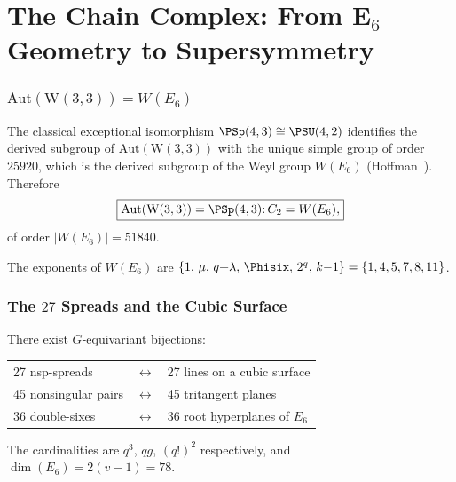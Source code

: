 \clearpage
\part{\texorpdfstring{The Chain Complex: From E${}_6$ Geometry to Supersymmetry}{The Chain Complex: From E6 Geometry to Supersymmetry}}

\section{\texorpdfstring{$\mathrm{Aut}(\mathrm{W}(3,3)) = W(E_6)$}{Aut(W(3,3)) = W(E6)}}

The classical exceptional isomorphism $\PSp(4,3)\cong\PSU(4,2)$
identifies the derived subgroup of $\mathrm{Aut}(\mathrm{W}(3,3))$
with the unique simple group of order $25920$, which is the
derived subgroup of the Weyl group $W(E_6)$
(Hoffman~\cite{HoffmanSpreads}).
Therefore
\begin{equation}
\boxed{\mathrm{Aut}(\mathrm{W}(3,3)) = \PSp(4,3){:}\,C_2 = W(E_6),}
\end{equation}
of order $|W(E_6)| = 51840$.

\begin{theorem}[$E_6$ Exponents $=$ W(3,3) Parameters]
The exponents of $W(E_6)$ are $\{1,\,\mu,\,q{+}\lambda,\,\Phisix,\,2^q,\,k{-}1\}
= \{1,4,5,7,8,11\}$.
\end{theorem}

\section{\texorpdfstring{The $27$ Spreads and the Cubic Surface}{The 27 Spreads and the Cubic Surface}}

\begin{theorem}
\label{thm:hoffman}
There exist $G$-equivariant bijections:
\begin{center}
\begin{tabular}{@{}lcl@{}}
27 nsp-spreads & $\longleftrightarrow$ & 27 lines on a cubic surface \\
45 nonsingular pairs & $\longleftrightarrow$ & 45 tritangent planes \\
36 double-sixes & $\longleftrightarrow$ & 36 root hyperplanes of $E_6$ \\
\end{tabular}
\end{center}
The cardinalities are $q^3$, $qg$, $(q!)^2$ respectively,
and $\dim(E_6) = 2(v{-}1) = 78$.
\end{theorem}

